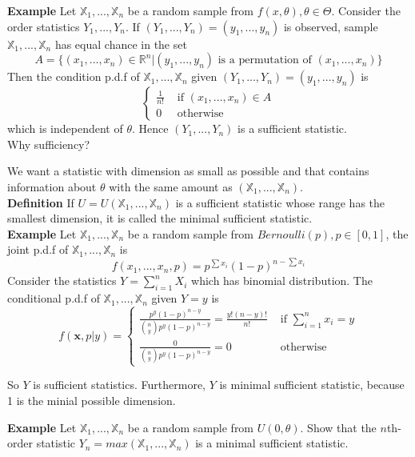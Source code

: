 \textbf{Example} Let $\mathbb{X}_1, ..., \mathbb{X}_n$ be a random sample from $f(x, \theta), \theta\in\Theta$. Consider the order statistics $Y_1, ..., Y_n$. If $(Y_1, ..., Y_n) = (y_1, ..., y_n)$ is observed, sample $\mathbb{X}_1, ..., \mathbb{X}_n$ has equal chance in the set 
$$A = \{ (x_1, ..., x_n)\in\mathbb{R}^n | (y_1, ..., y_n) \text{ is a permutation of } (x_1, ..., x_n) \}$$
Then the condition p.d.f of $\mathbb{X}_1, ..., \mathbb{X}_n$ given $(Y_1, ..., Y_n) = (y_1, ..., y_n)$ is
$$\begin{cases}
\frac{1}{n!} & \text{ if } (x_1, ..., x_n) \in A \\
0 & \text{ otherwise}
\end{cases}$$
which is independent of $\theta$. Hence $(Y_1, ..., Y_n)$ is a sufficient statistic.\\

Why sufficiency?

We want a statistic with dimension as small as possible and that contains information about $\theta$ with the same amount as $(\mathbb{X}_1, ..., \mathbb{X}_n)$.\\

\textbf{Definition} If $U = U(\mathbb{X}_1, ..., \mathbb{X}_n)$ is a sufficient statistic whose range has the smallest dimension, it is called the minimal sufficient statistic.\\

\textbf{Example} Let $\mathbb{X}_1, ..., \mathbb{X}_n$ be a random sample from $Bernoulli(p), {p\in[0,1]}$, the joint p.d.f of $\mathbb{X}_1, ..., \mathbb{X}_n$ is
$$f(x_1, ..., x_n, p) = p^{\sum x_i}(1-p)^{n-\sum x_i}$$
Consider the statistics $Y = \sum_{i=1}^n X_i$ which has binomial distribution. The conditional p.d.f of $\mathbb{X}_1, ..., \mathbb{X}_n$ given $Y=y$ is $$f(\textbf{x}, p | y) = 
\begin{cases}
\frac{p^y(1-p)^{n-y}}{{n \choose y}p^y(1-p)^{n-y}} = \frac{y!(n-y)!}{n!} & \text{ if } \sum_{i=1}^n x_i = y \\
\frac{0}{{n \choose y}p^y(1-p)^{n-y}} = 0 & \text{ otherwise}
\end{cases}$$  

So $Y$ is sufficient statistics. Furthermore, $Y$ is minimal sufficient statistic, because 1 is the minial possible dimension.

\textbf{Example} Let $\mathbb{X}_1, ..., \mathbb{X}_n$ be a random sample from $U(0, \theta)$. Show that the $n$th-order statistic $Y_n = max(\mathbb{X}_1, ..., \mathbb{X}_n)$ is a minimal sufficient statistic.\\

